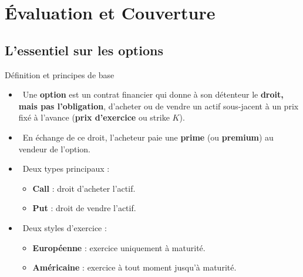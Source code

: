 \documentclass[aspectratio=169, 10pt]{beamer}
\begin{document}
\section{Évaluation et Couverture}

\subsection{L'essentiel sur les options}

\begin{frame}{Définition et principes de base}
    \begin{itemize}
        \item {} \ Une \textbf{option} est un contrat financier qui donne à son détenteur le \textbf{droit, mais pas l'obligation}, d'acheter ou de vendre un actif sous-jacent à un prix fixé à l'avance (\textbf{prix d'exercice} ou strike $K$).
        \item {} \ En échange de ce droit, l'acheteur paie une \textbf{prime} (ou \textbf{premium}) au vendeur de l'option.
        \item {} \ Deux types principaux :
        \begin{itemize}
            \item \textbf{Call} : droit d'acheter l'actif.
            \item \textbf{Put} : droit de vendre l'actif.
        \end{itemize}
        \item {} \ Deux styles d'exercice :
        \begin{itemize}
            \item \textbf{Européenne} : exercice uniquement à maturité.
            \item \textbf{Américaine} : exercice à tout moment jusqu'à maturité.
        \end{itemize}
    \end{itemize}
\end{frame}
\end{document}
